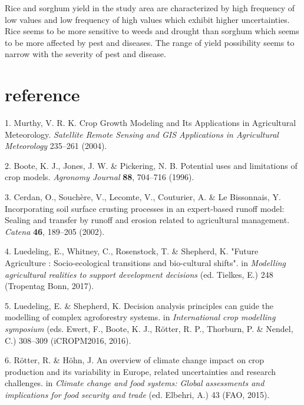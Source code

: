 \documentclass[12pt,oneside]{article}
\begin{document}
Rice and sorghum yield in the study area are characterized by high frequency of low values and low frequency of high values which exhibit higher uncertainties. Rice seems to be more sensitive to weeds and drought than sorghum which seems to be more affected by pest and diseases. The range of yield possibility seems to narrow with the severity of pest and disease.

\hypertarget{VI}{%
\section*{reference}\label{VI}}

\hypertarget{refs}{}
\leavevmode\hypertarget{ref-Murthy_2004}{}%
1. Murthy, V. R. K. Crop Growth Modeling and Its Applications in Agricultural Meteorology. \emph{Satellite Remote Sensing and GIS Applications in Agricultural Meteorology} 235--261 (2004).

\leavevmode\hypertarget{ref-Boote_et_al_1996}{}%
2. Boote, K. J., Jones, J. W. \& Pickering, N. B. Potential uses and limitations of crop models. \emph{Agronomy Journal} \textbf{88}, 704--716 (1996).

\leavevmode\hypertarget{ref-Cerdan_et_al_2002}{}%
3. Cerdan, O., Souchère, V., Lecomte, V., Couturier, A. \& Le Bissonnais, Y. Incorporating soil surface crusting processes in an expert-based runoff model: Sealing and transfer by runoff and erosion related to agricultural management. \emph{Catena} \textbf{46}, 189--205 (2002).

\leavevmode\hypertarget{ref-Luedeling_et_al_2017}{}%
4. Luedeling, E., Whitney, C., Rosenstock, T. \& Shepherd, K. "Future Agriculture : Socio-ecological transitions and bio-cultural shifts". in \emph{Modelling agricultural realities to support development decisions} (ed. Tielkes, E.) 248 (Tropentag Bonn, 2017).

\leavevmode\hypertarget{ref-Luedeling_and_Shepherd_2016}{}%
5. Luedeling, E. \& Shepherd, K. Decision analysis principles can guide the modelling of complex agroforestry systems. in \emph{International crop modelling symposium} (eds. Ewert, F., Boote, K. J., Rötter, R. P., Thorburn, P. \& Nendel, C.) 308--309 (iCROPM2016, 2016).

\leavevmode\hypertarget{ref-Rotter_and_Hohn_2015}{}%
6. Rötter, R. \& Höhn, J. An overview of climate change impact on crop production and its variability in Europe, related uncertainties and research challenges. in \emph{Climate change and food systems: Global assessments and implications for food security and trade} (ed. Elbehri, A.) 43 (FAO, 2015).
\end{document}
